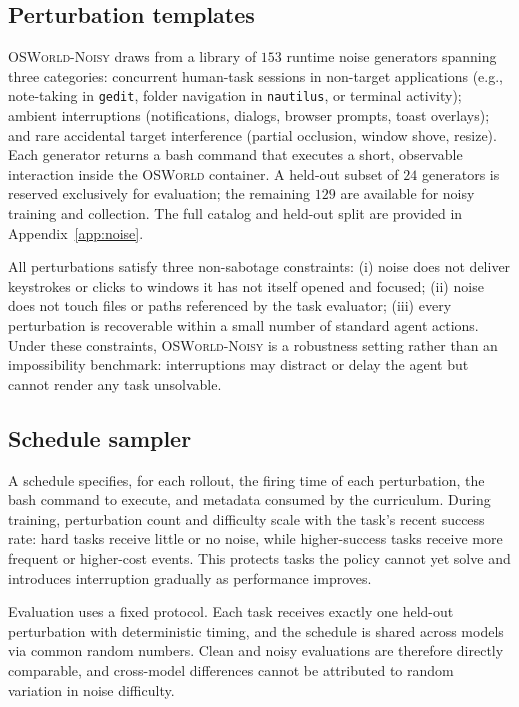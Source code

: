 \documentclass[11pt]{article}
\begin{document}
\subsection{Perturbation templates}
\label{sec:noise:library}

\textsc{OSWorld-Noisy} draws from a library of $153$ runtime noise
generators spanning three categories: concurrent human-task sessions
in non-target applications (e.g., note-taking in \texttt{gedit},
folder navigation in \texttt{nautilus}, or terminal activity); ambient
interruptions (notifications, dialogs, browser prompts, toast
overlays); and rare accidental target interference (partial occlusion,
window shove, resize). Each generator returns a bash command that
executes a short, observable interaction inside the \textsc{OSWorld}
container. A held-out subset of $24$ generators is reserved
exclusively for evaluation; the remaining $129$ are available for
noisy training and collection. The full catalog and held-out split
are provided in Appendix~\ref{app:noise}.

All perturbations satisfy three non-sabotage constraints: (i) noise
does not deliver keystrokes or clicks to windows it has not itself
opened and focused; (ii) noise does not touch files or paths
referenced by the task evaluator; (iii) every perturbation is
recoverable within a small number of standard agent actions. Under
these constraints, \textsc{OSWorld-Noisy} is a robustness setting
rather than an impossibility benchmark: interruptions may distract or
delay the agent but cannot render any task unsolvable.

\subsection{Schedule sampler}

A schedule specifies, for each rollout, the firing time of each
perturbation, the bash command to execute, and metadata consumed by
the curriculum. During training, perturbation count and difficulty
scale with the task's recent success rate: hard tasks receive little
or no noise, while higher-success tasks receive more frequent or
higher-cost events. This protects tasks the policy cannot yet solve
and introduces interruption gradually as performance improves.

Evaluation uses a fixed protocol. Each task receives exactly one
held-out perturbation with deterministic timing, and the schedule is
shared across models via common random numbers. Clean and noisy
evaluations are therefore directly comparable, and cross-model
differences cannot be attributed to random variation in noise
difficulty.
\end{document}
